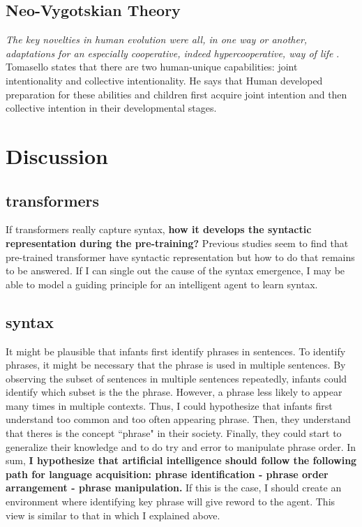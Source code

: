 \documentclass[12pt]{article}
\begin{document}
\subsection{Neo-Vygotskian Theory}
\textit{The key novelties in human evolution were all, in one way or another, adaptations for an especially 
cooperative, indeed hypercooperative, way of life} \cite{Tomasello19}. Tomasello states that there 
are two human-unique capabilities: joint intentionality and collective intentionality. He says that 
Human developed preparation for these abilities and children first acquire joint intention and then 
collective intention in their developmental stages.

\section{Discussion}
\subsection{transformers}
If transformers really capture syntax, \textbf{how it develops the syntactic representation during the pre-training? }
Previous studies seem to find that pre-trained transformer have syntactic representation but how to do that remains 
to be answered. If I can single out the cause of the syntax emergence, I may be able to model a guiding principle 
for an intelligent agent to learn syntax.

\subsection{syntax}
It might be plausible that infants first identify phrases in sentences. To identify phrases, it might be necessary 
that the phrase is used in multiple sentences. By observing the subset of sentences in multiple sentences repeatedly, 
infants could identify which subset is the the phrase. However, a phrase less likely to appear many times in multiple contexts. 
Thus, I could hypothesize that infants first understand too common and too often appearing phrase. Then, they 
understand that theres is the concept ``phrase" in their society. Finally, they could start to generalize their knowledge 
and to do try and error to manipulate phrase order. In sum,\textbf{ I hypothesize that artificial intelligence should 
follow the following path for language acquisition: phrase identification - phrase order arrangement - phrase manipulation. }
If this is the case, I should create an environment where identifying key phrase will give reword to the agent. 
This view is similar to that in \cite{Okanoya07} which I explained above.
\end{document}
